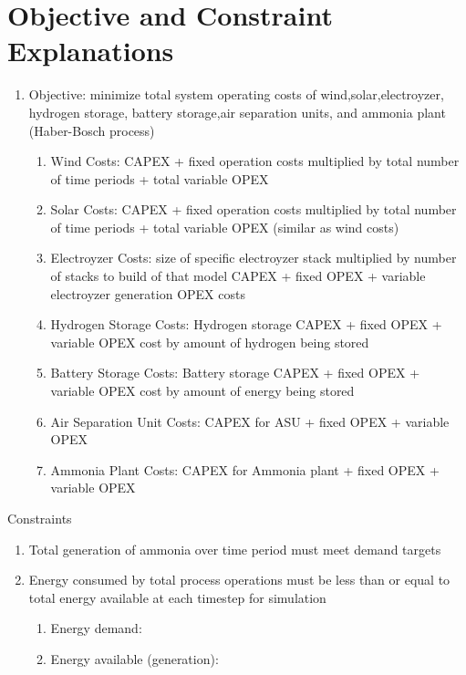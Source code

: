 \documentclass[12 pt]{article}
\begin{document}
\section*{Objective and Constraint Explanations}
\begin{enumerate}
  \item Objective: minimize total system operating costs of wind,solar,electroyzer, hydrogen storage, battery storage,air separation units, and ammonia plant (Haber-Bosch process)
  \begin{enumerate}
  	\item Wind Costs: CAPEX + fixed operation costs multiplied by total number of time periods + total variable OPEX
  	\item Solar Costs: CAPEX + fixed operation costs multiplied by total number of time periods + total variable OPEX (similar as wind costs)
  	\item Electroyzer Costs: size of specific electroyzer stack multiplied by number of stacks to build of that model CAPEX + fixed OPEX + variable electroyzer generation OPEX costs
  	\item Hydrogen Storage Costs: Hydrogen storage CAPEX + fixed OPEX + variable OPEX cost by amount of hydrogen being stored
  	\item Battery Storage Costs: Battery storage CAPEX + fixed OPEX + variable OPEX cost by amount of energy being stored
  	\item Air Separation Unit Costs: CAPEX for ASU + fixed OPEX + variable OPEX 
  	\item Ammonia Plant Costs: CAPEX for Ammonia plant + fixed OPEX + variable OPEX 
  \end{enumerate}

\end{enumerate}

Constraints
\begin{enumerate}
  \item Total generation of ammonia over time period must meet demand targets
  \item Energy consumed by total process operations must be less than or equal to total energy available at each timestep for simulation
  \begin{enumerate}
  	\item Energy demand:
  	\item Energy available (generation):
  	
  \end{enumerate}

\end{enumerate}
\end{document}
